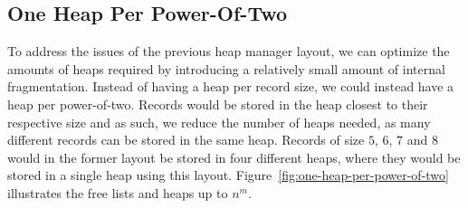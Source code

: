 \subsection{One Heap Per Power-Of-Two}
\label{subsec:one-heap-per-power-of-two}
To address the issues of the previous heap manager layout, we can optimize the amounts of heaps required by introducing a relatively small amount of internal fragmentation. Instead of having a heap per record size, we could instead have a heap per power-of-two. Records would be stored in the heap closest to their respective size and as such, we reduce the number of heaps needed, as many different records can be stored in the same heap. Records of size $5$, $6$, $7$ and $8$ would in the former layout be stored in four different heaps, where they would be stored in a single heap using this layout. Figure~\ref{fig:one-heap-per-power-of-two} illustrates the free lists and heaps up to $n^m$. 

